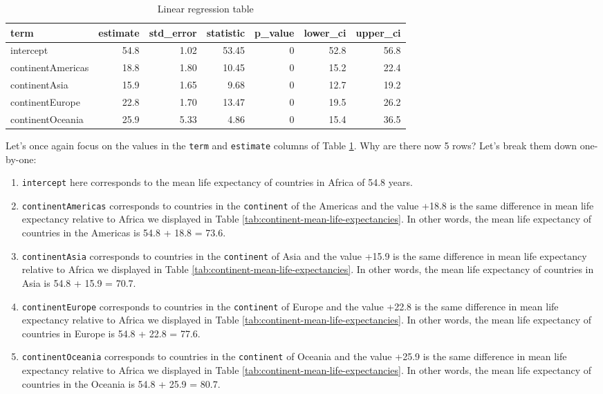 \documentclass[12pt, krantz2,]{krantz}
\providecommand{\tightlist}{%
  \setlength{\itemsep}{0pt}\setlength{\parskip}{0pt}}
\begin{document}
\begin{table}[H]

\caption{\label{tab:catxplot4b}Linear regression table}
\centering
\fontsize{10}{12}\selectfont
\begin{tabular}{lrrrrrr}
\toprule
term & estimate & std\_error & statistic & p\_value & lower\_ci & upper\_ci\\
\midrule
intercept & 54.8 & 1.02 & 53.45 & 0 & 52.8 & 56.8\\
continentAmericas & 18.8 & 1.80 & 10.45 & 0 & 15.2 & 22.4\\
continentAsia & 15.9 & 1.65 & 9.68 & 0 & 12.7 & 19.2\\
continentEurope & 22.8 & 1.70 & 13.47 & 0 & 19.5 & 26.2\\
continentOceania & 25.9 & 5.33 & 4.86 & 0 & 15.4 & 36.5\\
\bottomrule
\end{tabular}
\end{table}

Let's once again focus on the values in the \texttt{term} and \texttt{estimate} columns of Table \ref{tab:catxplot4b}. Why are there now 5 rows? Let's break them down one-by-one:

\begin{enumerate}
\def\labelenumi{\arabic{enumi}.}
\tightlist
\item
  \texttt{intercept} here corresponds to the mean life expectancy of countries in Africa of 54.8 years.
\item
  \texttt{continentAmericas} corresponds to countries in the \texttt{continent} of the Americas and the value +18.8 is the same difference in mean life expectancy relative to Africa we displayed in Table \ref{tab:continent-mean-life-expectancies}. In other words, the mean life expectancy of countries in the Americas is 54.8 + 18.8 = 73.6.
\item
  \texttt{continentAsia} corresponds to countries in the \texttt{continent} of Asia and the value +15.9 is the same difference in mean life expectancy relative to Africa we displayed in Table \ref{tab:continent-mean-life-expectancies}. In other words, the mean life expectancy of countries in Asia is 54.8 + 15.9 = 70.7.
\item
  \texttt{continentEurope} corresponds to countries in the \texttt{continent} of Europe and the value +22.8 is the same difference in mean life expectancy relative to Africa we displayed in Table \ref{tab:continent-mean-life-expectancies}. In other words, the mean life expectancy of countries in Europe is 54.8 + 22.8 = 77.6.
\item
  \texttt{continentOceania} corresponds to countries in the \texttt{continent} of Oceania and the value +25.9 is the same difference in mean life expectancy relative to Africa we displayed in Table \ref{tab:continent-mean-life-expectancies}. In other words, the mean life expectancy of countries in the Oceania is 54.8 + 25.9 = 80.7.
\end{enumerate}
\end{document}
